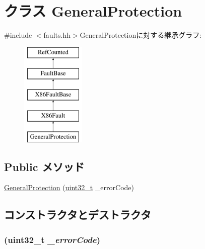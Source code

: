 \hypertarget{classX86ISA_1_1GeneralProtection}{
\section{クラス GeneralProtection}
\label{classX86ISA_1_1GeneralProtection}
}


{\ttfamily \#include $<$faults.hh$>$}GeneralProtectionに対する継承グラフ:\begin{figure}[H]
\begin{center}
\leavevmode
\includegraphics[height=5cm]{classX86ISA_1_1GeneralProtection}
\end{center}
\end{figure}
\subsection*{Public メソッド}
\begin{DoxyCompactItemize}
\item 
\hyperlink{classX86ISA_1_1GeneralProtection_a3ba05dc7d7ff55a112669d601054b1b2}{GeneralProtection} (\hyperlink{Type_8hh_a435d1572bf3f880d55459d9805097f62}{uint32\_\-t} \_\-errorCode)
\end{DoxyCompactItemize}


\subsection{コンストラクタとデストラクタ}
\hypertarget{classX86ISA_1_1GeneralProtection_a3ba05dc7d7ff55a112669d601054b1b2}{
\subsubsection[{GeneralProtection}]{ ({\bf uint32\_\-t} {\em \_\-errorCode})}}
\label{classX86ISA_1_1GeneralProtection_a3ba05dc7d7ff55a112669d601054b1b2}



